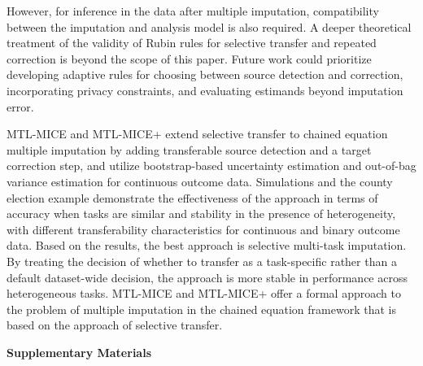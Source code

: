 \documentclass[12pt]{article}
\begin{document}
However, for inference in the data after multiple imputation, compatibility between the imputation and analysis model is also required. A deeper theoretical treatment of the validity of Rubin rules for selective transfer and repeated correction is beyond the scope of this paper. Future work could prioritize developing adaptive rules for choosing between source detection and correction, incorporating privacy constraints, and evaluating estimands beyond imputation error.

MTL-MICE and MTL-MICE+ extend selective transfer to chained equation multiple imputation by adding transferable source detection and a target correction step, and utilize bootstrap-based uncertainty estimation and out-of-bag variance estimation for continuous outcome data. Simulations and the county election example demonstrate the effectiveness of the approach in terms of accuracy when tasks are similar and stability in the presence of heterogeneity, with different transferability characteristics for continuous and binary outcome data. Based on the results, the best approach is selective multi-task imputation. By treating the decision of whether to transfer as a task-specific rather than a default dataset-wide decision, the approach is more stable in performance across heterogeneous tasks. MTL-MICE and MTL-MICE+ offer a formal approach to the problem of multiple imputation in the chained equation framework that is based on the approach of selective transfer.

\clearpage

%


\newpage
\begin{center}
{\Large\bf Supplementary Materials}
\end{center}
\label{sec:supplementary}

\end{document}
